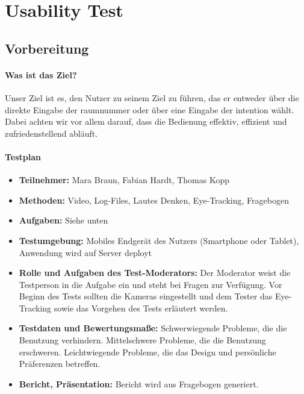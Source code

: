 \chapter{Usability Test}

\section{Vorbereitung}

\subsubsection*{Was ist das Ziel?}
Unser Ziel ist es, den Nutzer zu seinem Ziel zu führen, das er entweder über die direkte Eingabe der \gls{raum}nummer oder über eine Eingabe der \gls{intention} wählt.
Dabei achten wir vor allem darauf, dass die Bedienung effektiv, effizient und zufriedenstellend abläuft.
\subsubsection*{Testplan}
\begin{itemize}
\item \textbf{Teilnehmer:} Mara Braun, Fabian Hardt, Thomas Kopp
\item \textbf{Methoden:} Video, Log-Files, Lautes Denken, Eye-Tracking, Fragebogen
\item \textbf{Aufgaben:} Siehe unten
\item \textbf{Testumgebung:} Mobiles Endgerät des Nutzers (Smartphone oder Tablet), Anwendung wird auf Server deployt
\item \textbf{Rolle und Aufgaben des Test-Moderators:} Der Moderator weist die Testperson in die Aufgabe ein und steht bei Fragen zur Verfügung. Vor Beginn des Tests sollten die Kameras eingestellt und dem Tester das Eye-Tracking sowie das Vorgehen des Tests erläutert werden.
\item \textbf{Testdaten und Bewertungsmaße:} Schwerwiegende Probleme, die die Benutzung verhindern. Mittelschwere Probleme, die die Benutzung erschweren. Leichtwiegende Probleme, die das Design und persönliche Präferenzen betreffen.
\item \textbf{Bericht, Präsentation:} Bericht wird aus Fragebogen generiert.

\end{itemize}
